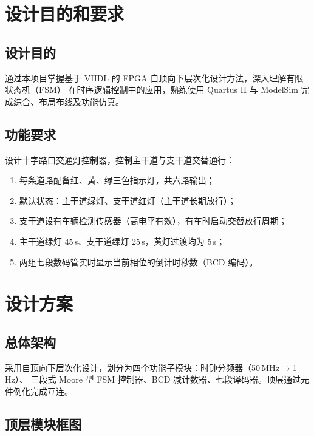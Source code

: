 \documentclass[12pt,a4paper]{ctexart}
\begin{document}
\section{设计目的和要求}

\subsection{设计目的}

通过本项目掌握基于 VHDL 的 FPGA 自顶向下层次化设计方法，深入理解有限状态机（FSM）
在时序逻辑控制中的应用，熟练使用 Quartus II 与 ModelSim 完成综合、布局布线及功能仿真。

\subsection{功能要求}

设计十字路口交通灯控制器，控制主干道与支干道交替通行：

\begin{enumerate}[label=(\arabic*), itemsep=2pt]
    \item 每条道路配备红、黄、绿三色指示灯，共六路输出；
    \item 默认状态：主干道绿灯、支干道红灯（主干道长期放行）；
    \item 支干道设有车辆检测传感器（高电平有效），有车时启动交替放行周期；
    \item 主干道绿灯 45\,s、支干道绿灯 25\,s，黄灯过渡均为 5\,s；
    \item 两组七段数码管实时显示当前相位的倒计时秒数（BCD 编码）。
\end{enumerate}

\newpage

\section{设计方案}

\subsection{总体架构}

采用自顶向下层次化设计，划分为四个功能子模块：时钟分频器（50\,MHz$\to$1\,Hz）、
三段式 Moore 型 FSM 控制器、BCD 减计数器、七段译码器。顶层通过元件例化完成互连。

\subsection{顶层模块框图}
\end{document}
